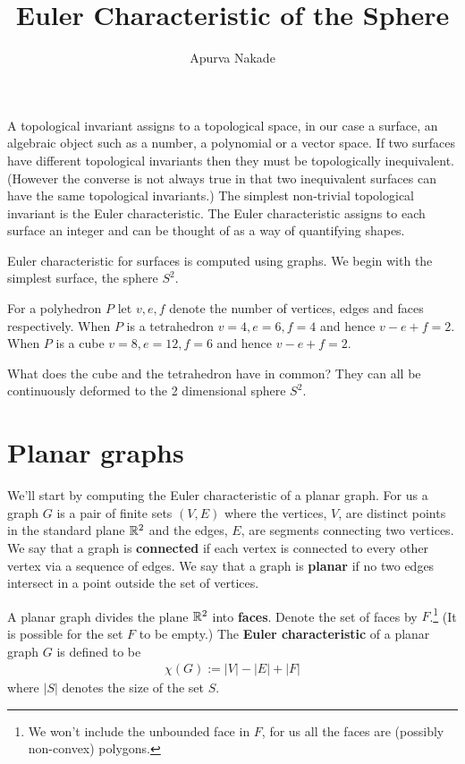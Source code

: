 




\renewcommand{\thefootnote}{\fnsymbol{footnote}}


\title{Euler Characteristic of the Sphere}
\author{Apurva Nakade}
\maketitle

A topological invariant assigns to a topological space, in our case a surface, an algebraic object such as a number, a polynomial or a vector space. If two surfaces have different topological invariants then they must be topologically inequivalent. (However the converse is not always true in that two inequivalent surfaces can have the same topological invariants.) The simplest non-trivial topological invariant is the Euler characteristic. The Euler characteristic assigns to each surface an integer and can be thought of as a way of quantifying shapes.

Euler characteristic for surfaces is computed using graphs. We begin with the simplest surface, the sphere $ S ^ 2 $.

\begin{example}
	For a polyhedron $P$ let $v,e,f$ denote the number of vertices, edges and faces respectively. When $P$ is a tetrahedron $v = 4, e=6, f=4$ and hence $v-e+f = 2$. When $P$ is a cube $v = 8, e=12, f=6$ and hence $v-e+f = 2$.
\end{example}

What does the cube and the tetrahedron have in common? They can all be continuously deformed to the 2 dimensional sphere $ S^2 $.



\section{Planar graphs}
We'll start by computing the Euler characteristic of a planar graph. For us a graph $ G $ is a pair of finite sets $(V,E) $ where the vertices, $ V $, are distinct points in the standard plane $ \mathbb{R} ^2 $ and the edges, $ E $, are segments connecting two vertices. We say that a graph is \textbf{connected} if each vertex is connected to every other vertex via a sequence of edges. We say that a graph is \textbf{planar} if no two edges intersect in a point outside the set of vertices.


A planar graph divides the plane $ \mathbb{R} ^ 2 $ into \textbf{faces}. Denote the set of faces by $ F $.\footnote{We won't include the unbounded face in $F$, for us all the faces are (possibly non-convex) polygons.} (It is possible for the set $ F $ to be empty.) The \textbf{Euler characteristic} of a planar graph $ G $ is defined to be
\begin{align*}
	\chi (G):= |V| - |E| + |F|
\end{align*}
where $ |S| $ denotes the size of the set $ S $.

